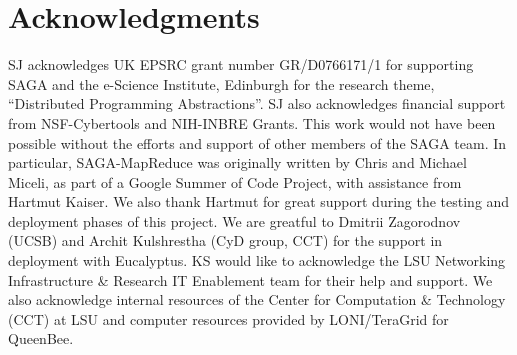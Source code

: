 \documentclass[conference,final]{IEEEtran}
\newcommand{\sagamapreduce }{SAGA-MapReduce }
\begin{document}
\section{Acknowledgments}

SJ acknowledges UK EPSRC grant number GR/D0766171/1 for supporting
SAGA and the e-Science Institute, Edinburgh for the research theme,
``Distributed Programming Abstractions''.  SJ also acknowledges
financial support from NSF-Cybertools and NIH-INBRE Grants. This work
would not have been possible without the efforts and support of other
members of the SAGA team.  In particular, \sagamapreduce was
originally written by Chris and Michael Miceli, as part of a Google
Summer of Code Project, with assistance from Hartmut Kaiser. We also
thank Hartmut for great support during the testing and deployment
phases of this project. We are greatful to Dmitrii Zagorodnov (UCSB)
and Archit Kulshrestha (CyD group, CCT) for the support in deployment
with Eucalyptus.  KS would like to acknowledge the LSU Networking
Infrastructure \& Research IT Enablement team for their help and
support.  We also acknowledge internal resources of the Center for
Computation \& Technology (CCT) at LSU and computer resources provided
by LONI/TeraGrid for QueenBee.  

\end{document}
